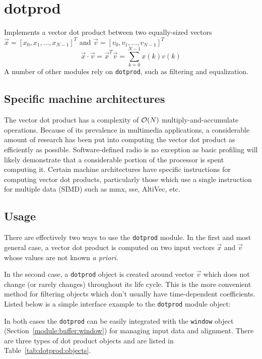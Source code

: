 % 
%

\newpage
\section{dotprod}
\label{module:dotprod}
Implements a vector dot product between two equally-sized vectors
$\vec{x} = \left[x_0,x_1,\ldots,x_{N-1}\right]^T$ and
$\vec{v} = \left[v_0,v_1,\ldots,v_{N-1}\right]^T$
\[
    \vec{x} \cdot \vec{v}   =
    \vec{x}^T \vec{v}       =
    \sum_{k=0}^{N-1}{ x(k) v(k) }
\]
A number of other modules rely on {\tt dotprod}, such as filtering and
equalization.

\subsection{Specific machine architectures}
\label{module:dotprod:arch}
The vector dot product has a complexity of $\mathcal{O}(N)$ multiply-and-accumulate
operations.
Because of its prevalence in multimedia applications, a considerable amount of
research has been put into computing the vector dot product as efficiently as
possible.
Software-defined radio is no exception as basic profiling will likely
demonstrate that a considerable portion of the processor is spent computing
it.
Certain machine architectures have specific instructions for computing vector
dot products, particularly those which use a single instruction for
multiple data (SIMD) such as mmx, sse, AltiVec, etc.

\subsection{Usage}
\label{module:dotprod:usage}
There are effectively two ways to use the {\tt dotprod} module.
In the first and most general case, a vector dot product is computed on two
input vectors $\vec{x}$ and $\vec{v}$ whose values are not known
{\it a priori}.

In the second case, a {\tt dotprod} object is created around vector $\vec{v}$
which does not change (or rarely changes) throughout its life cycle.
This is the more convenient method for filtering objects which don't usually
have time-dependent coefficients.
Listed below is a simple interface example to the {\tt dotprod} module
object:
%

%
In both cases the {\tt dotprod} can be easily integrated with the
{\tt window} object (Section~\ref{module:buffer:window})
for managing input data and alignment.
There are three types of dot product objects and are listed in
Table~\ref{tab:dotprod:objects}.

